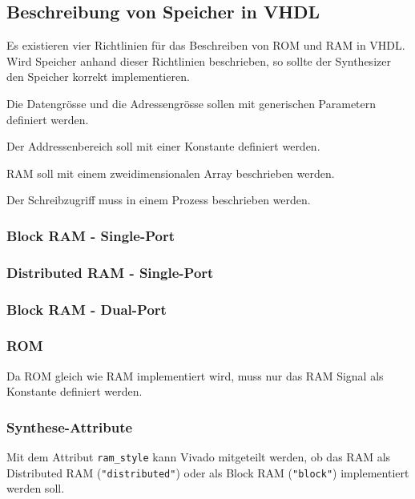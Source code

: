 \subsection{Beschreibung von Speicher in VHDL}
Es existieren vier Richtlinien für das Beschreiben von ROM und RAM in VHDL. Wird Speicher anhand dieser Richtlinien beschrieben, so sollte der Synthesizer den Speicher korrekt implementieren.
\begin{compactenum}
    \item Die Datengrösse und die Adressengrösse sollen mit generischen Parametern definiert werden.
    \item Der Addressenbereich soll mit einer Konstante definiert werden.
    \item RAM soll mit einem zweidimensionalen Array beschrieben werden.
    \item Der Schreibzugriff muss in einem Prozess beschrieben werden.
\end{compactenum}

\subsubsection{Block RAM - Single-Port}


\subsubsection{Distributed RAM - Single-Port}


\subsubsection{Block RAM - Dual-Port}


\subsubsection{ROM}
Da ROM gleich wie RAM implementiert wird, muss nur das RAM Signal als Konstante definiert werden.


\subsubsection{Synthese-Attribute}
Mit dem Attribut \texttt{ram\_style} kann Vivado mitgeteilt werden, ob das RAM als Distributed RAM (\texttt{"distributed"}) oder als Block RAM (\texttt{"block"}) implementiert werden soll.


